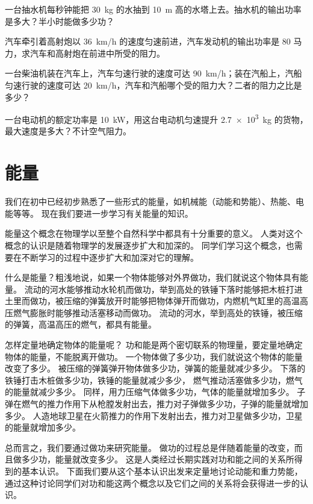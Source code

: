 \begin{Practice}
\begin{question}
    \item 一台抽水机每秒钟能把 \qty{30}{kg} 的水抽到 \qty{10}{m} 高的水塔上去。抽水机的输出功率是多大？半小时能做多少功？
    \item 汽车牵引着高射炮以 \qty{36}{km/h} 的速度匀速前进，汽车发动机的输出功率是 80 马力，求汽车和高射炮在前进中所受的阻力。
    \item 一台柴油机装在汽车上，汽车匀速行驶的速度可达 \qty{90}{km/h}；装在汽船上，汽船匀速行驶的速度可达 \qty{20}{km/h}，汽车和汽船哪个受的阻力大？二者的阻力之比是多少？
    \item 一台电动机的额定功率是 \qty{10}{kW}，用这台电动机匀速提升 \qty{2.7e3}{kg} 的货物，最大速度是多大？不计空气阻力。
\end{question}
\end{Practice}

\section{能量}
我们在初中已经初步熟悉了一些形式的能量，如机械能（动能和势能）、热能、电能等等。
现在我们要进一步学习有关能量的知识。

能量这个概念在物理学以至整个自然科学中都具有十分重要的意义。
人类对这个概念的认识是随着物理学的发展逐步扩大和加深的。
同学们学习这个概念，也需要在不断学习的过程中逐步扩大和加深对它的理解。

什么是能量？粗浅地说，如果一个物体能够对外界做功，我们就说这个物体具有能量。
流动的河水能够推动水轮机而做功，举到高处的铁锤下落时能够把木桩打进土里而做功，被压缩的弹簧放开时能够把物体弹开而做功，内燃机气缸里的高温高压燃气膨胀时能够推动活塞移动而做功。
流动的河水，举到高处的铁锤，被压缩的弹簧，高温高压的燃气，都具有能量。

怎样定量地确定物体的能量呢？
功和能是两个密切联系的物理量，要定量地确定物体的能量，不能脱离开做功。
一个物体做了多少功，我们就说这个物体的能量改变了多少。
被压缩的弹簧弹开物体做多少功，弹簧的能量就减少多少。
下落的铁锤打击木桩做多少功，铁锤的能量就减少多少，
燃气推动活塞做多少功，燃气的能量就减少多少。
同样，用力压缩气体做多少功，气体的能量就增加多少。
子弹在燃气的推力作用下从枪膛发射出去，推力对子弹做多少功，子弹的能量就增加多少。
人造地球卫星在火箭推力的作用下发射出去，推力对卫星做多少功，卫星的能量就增加多少。

总而言之，我们要通过做功来研究能量。
做功的过程总是伴随着能量的改变，而且做多少功，能量就改变多少。
这是人类经过长期实践对功和能之间的关系所得到的基本认识。
下面我们要从这个基本认识出发来定量地讨论动能和重力势能，通过这种讨论同学们对功和能这两个概念以及它们之间的关系将会获得进一步的认识。

